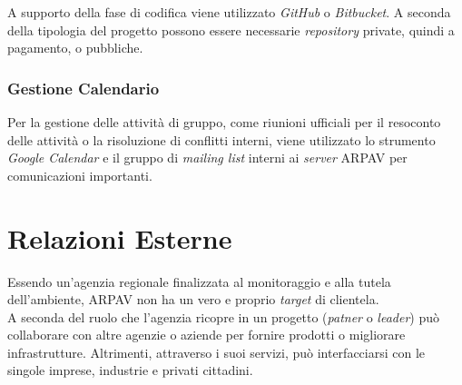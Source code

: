 A supporto della fase di codifica viene utilizzato \textit{GitHub} o \textit{Bitbucket}. A seconda della tipologia del progetto possono essere necessarie \textit{repository} private, quindi a pagamento, o pubbliche.

\subsubsection{Gestione Calendario}

Per la gestione delle attività di gruppo, come riunioni ufficiali per il resoconto delle attività o la risoluzione di conflitti interni, viene utilizzato lo strumento \textit{Google Calendar} e il gruppo di \textit{mailing list} interni ai \textit{server} ARPAV per comunicazioni importanti.







\section{Relazioni Esterne}


Essendo un'agenzia regionale finalizzata al monitoraggio e alla tutela dell'ambiente, ARPAV non ha un vero e proprio \textit{target} di clientela. \\
A seconda del ruolo che l'agenzia ricopre in un progetto (\textit{patner} o \textit{leader}) può collaborare con altre agenzie o aziende per fornire prodotti o migliorare infrastrutture. Altrimenti, attraverso i suoi servizi, può interfacciarsi con le singole imprese, industrie e  privati cittadini. 

